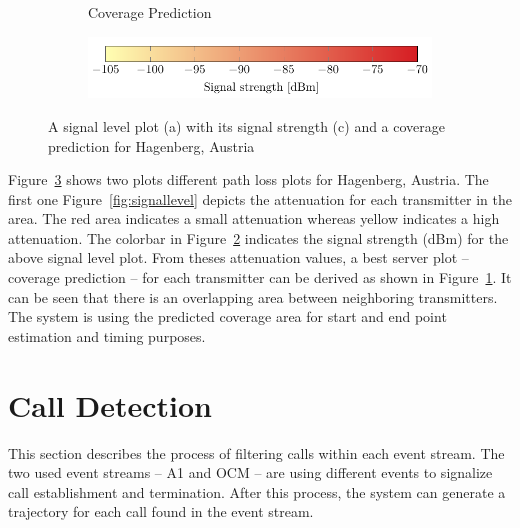 \documentclass[master,english]{hgbthesis}
\begin{document}
\begin{figure}
\begin{subfigure}[b]{0.45\textwidth}
		\caption{Coverage Prediction}
		\label{fig:coveragepred}
	\end{subfigure}
\begin{subfigure}[b]{\textwidth}
		\includegraphics[width=\textwidth]{./images/signallevelbar}
		\caption{}
		\label{fig:signallevelbar}
	\end{subfigure}
	\caption{A signal level plot (a) with its signal strength (c) and a coverage prediction for Hagenberg, Austria }
	\label{fig:cellarea}
\end{figure}
Figure~\ref{fig:cellarea} shows two plots different path loss plots for Hagenberg, Austria. The first one Figure~\ref{fig:signallevel} depicts the attenuation for each transmitter in the area. The red area indicates a small attenuation whereas yellow indicates a high attenuation. The colorbar in Figure~\ref{fig:signallevelbar} indicates the signal strength (dBm) for the above signal level plot.
%
From theses attenuation values, a best server plot -- coverage prediction -- for each transmitter can be derived as shown in Figure~\ref{fig:coveragepred}. It can be seen that there is an overlapping area between neighboring transmitters. The system is using the predicted coverage area for start and end point estimation and timing purposes.
\section{Call Detection}
This section describes the process of filtering calls within each event stream. The two used event streams -- A1 and OCM -- are using different events to signalize call establishment and termination. After this process, the system can generate a trajectory for each call found in the event stream.
\end{document}
